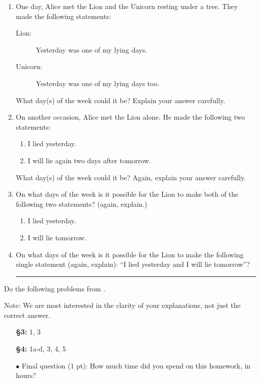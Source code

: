\begin{enumerate}

\item One day, Alice met the Lion and the Unicorn resting under a tree. They made the following statements: 
\begin{description}
\item[Lion:] Yesterday was one of my lying days.
\item[Unicorn:] Yesterday was one of my lying days too.
\end{description} 
What day(s) of the week could it be? Explain your answer carefully. 



\item On another occasion, Alice met the Lion alone. He made the following two statements: 
\begin{enumerate} 
\item I lied yesterday.
\item I will lie again two days after tomorrow. 
\end{enumerate} 
What day(s) of the week could it be? Again, explain your answer carefully. 



\item On what days of the week is it possible for the Lion to make both of the following two statements?  (again, explain.)
\begin{enumerate}
\item I lied yesterday.
\item I will lie tomorrow. 
\end{enumerate} 



\item On what days of the week is it possible for the Lion to make the following single statement (again, explain): ``I lied yesterday and I will lie tomorrow''?



\bigskip
\hrule
\bigskip

\end{enumerate}

 Do the following problems from \thetextbook. 

Note: We are most interested in the clarity of your explanations, not just the correct answer.
\begin{itemize}
\item[\bfseries\S 3:] 1, 3 

\item[\bfseries\S 4:] 1a-d, 3, 4, 5 

\item[$\bullet$] Final question (1 pt): How much time did you spend on this homework, in hours?

\end{itemize}

